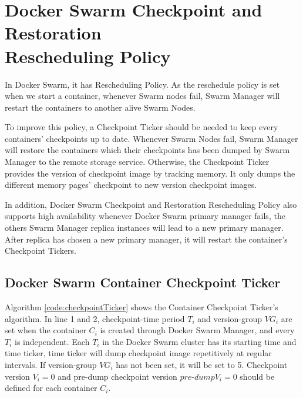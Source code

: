 \section{Docker Swarm Checkpoint and Restoration \\Rescheduling Policy}
\label{sec:checkpoint restore rescheduling policy}
In Docker Swarm, it has Rescheduling Policy. As the reschedule policy is set when we start a container, whenever Swarm nodes fail, Swarm Manager will restart the containers to another alive Swarm Nodes.

To improve this policy, a Checkpoint Ticker should be needed to keep every containers' checkpoints up to date.
Whenever Swarm Nodes fail, Swarm Manager will restore the containers which their checkpoints has been dumped by Swarm Manager to the remote storage service.
Otherwise, the Checkpoint Ticker provides the version of checkpoint image by tracking memory. It only dumps the different memory pages' checkpoint to new version checkpoint images.

In addition, Docker Swarm Checkpoint and Restoration Rescheduling Policy also supports high availability whenever Docker Swarm primary manager fails, the others Swarm Manager replica instances will lead to a new primary manager. After replica has chosen a new primary manager, it will restart the container's Checkpoint Tickers.

\subsection{Docker Swarm Container Checkpoint Ticker}
Algorithm \ref{code:checkpointTicker} shows the Container Checkpoint Ticker's algorithm.
In line 1 and 2, checkpoint-time period $T_i$ and version-group $VG_i$ are set when the container $C_i$ is created through Docker Swarm Manager, and every $T_i$ is independent.
Each $T_i$ in the Docker Swarm cluster has its starting time and time ticker, time ticker will dump checkpoint image repetitively at regular intervals. If version-group $VG_i$ has not been set, it will be set to 5.
Checkpoint version $V_i=0$ and pre-dump checkpoint version $pre$-$dump V_i=0$ should be defined for each container $C_i$.

